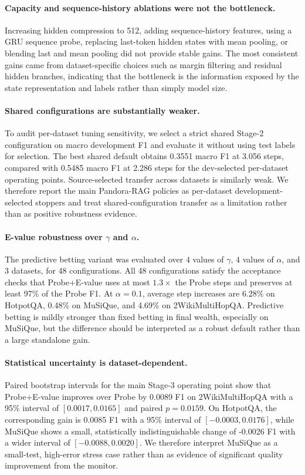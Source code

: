 \documentclass{article}
\newcommand{\method}{Pandora-RAG}
\newcommand{\hotpot}{HotpotQA}
\newcommand{\musique}{MuSiQue}
\newcommand{\twowiki}{2WikiMultiHopQA}
\begin{document}
\paragraph{Capacity and sequence-history ablations were not the bottleneck.}
Increasing hidden compression to 512, adding sequence-history features, using a GRU sequence probe, replacing last-token hidden states with mean pooling, or blending last and mean pooling did not provide stable gains. The most consistent gains came from dataset-specific choices such as margin filtering and residual hidden branches, indicating that the bottleneck is the information exposed by the state representation and labels rather than simply model size.

\paragraph{Shared configurations are substantially weaker.}
To audit per-dataset tuning sensitivity, we select a strict shared Stage-2 configuration on macro development F1 and evaluate it without using test labels for selection. The best shared default obtains 0.3551 macro F1 at 3.056 steps, compared with 0.5485 macro F1 at 2.286 steps for the dev-selected per-dataset operating points. Source-selected transfer across datasets is similarly weak. We therefore report the main \method{} policies as per-dataset development-selected stoppers and treat shared-configuration transfer as a limitation rather than as positive robustness evidence.

\paragraph{E-value robustness over $\gamma$ and $\alpha$.}
The predictive betting variant was evaluated over $4$ values of $\gamma$, $4$ values of $\alpha$, and $3$ datasets, for 48 configurations. All 48 configurations satisfy the acceptance checks that Probe+E-value uses at most $1.3\times$ the Probe steps and preserves at least 97\% of the Probe F1. At $\alpha=0.1$, average step increases are 6.28\% on \hotpot{}, 0.48\% on \musique{}, and 4.69\% on \twowiki{}. Predictive betting is mildly stronger than fixed betting in final wealth, especially on \musique{}, but the difference should be interpreted as a robust default rather than a large standalone gain.

\paragraph{Statistical uncertainty is dataset-dependent.}
Paired bootstrap intervals for the main Stage-3 operating point show that Probe+E-value improves over Probe by 0.0089 F1 on \twowiki{} with a 95\% interval of $[0.0017,0.0165]$ and paired $p=0.0159$. On \hotpot{}, the corresponding gain is 0.0085 F1 with a 95\% interval of $[-0.0003,0.0176]$, while \musique{} shows a small, statistically indistinguishable change of -0.0026 F1 with a wider interval of $[-0.0088,0.0020]$. We therefore interpret \musique{} as a small-test, high-error stress case rather than as evidence of significant quality improvement from the monitor.
\end{document}
